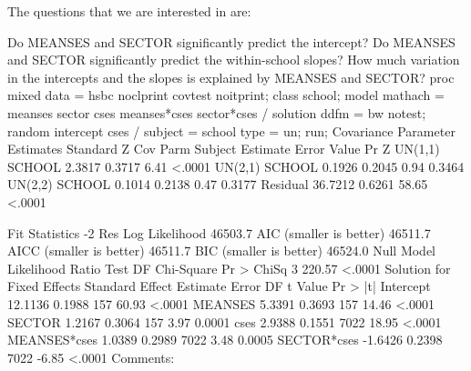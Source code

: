 The questions that we are interested in are:

Do MEANSES and SECTOR significantly predict the intercept?
Do MEANSES and SECTOR significantly predict the within-school slopes?
How much variation in the intercepts and the slopes is explained by MEANSES and SECTOR?
proc mixed data = hsbc noclprint covtest noitprint;
  class school;
  model mathach = meanses sector cses meanses*cses sector*cses 
                  / solution ddfm = bw notest;
  random intercept cses / subject = school type = un;
run;
                  Covariance Parameter Estimates
                                    Standard         Z
Cov Parm     Subject    Estimate       Error     Value        Pr Z
UN(1,1)      SCHOOL       2.3817      0.3717      6.41      <.0001
UN(2,1)      SCHOOL       0.1926      0.2045      0.94      0.3464
UN(2,2)      SCHOOL       0.1014      0.2138      0.47      0.3177
Residual                 36.7212      0.6261     58.65      <.0001

           Fit Statistics
-2 Res Log Likelihood         46503.7
AIC (smaller is better)       46511.7
AICC (smaller is better)      46511.7
BIC (smaller is better)       46524.0
  Null Model Likelihood Ratio Test
    DF    Chi-Square      Pr > ChiSq
     3        220.57          <.0001
                    Solution for Fixed Effects
                            Standard
Effect          Estimate       Error      DF    t Value    Pr > |t|
Intercept        12.1136      0.1988     157      60.93      <.0001
MEANSES           5.3391      0.3693     157      14.46      <.0001
SECTOR            1.2167      0.3064     157       3.97      0.0001
cses              2.9388      0.1551    7022      18.95      <.0001
MEANSES*cses      1.0389      0.2989    7022       3.48      0.0005
SECTOR*cses      -1.6426      0.2398    7022      -6.85      <.0001
Comments:

